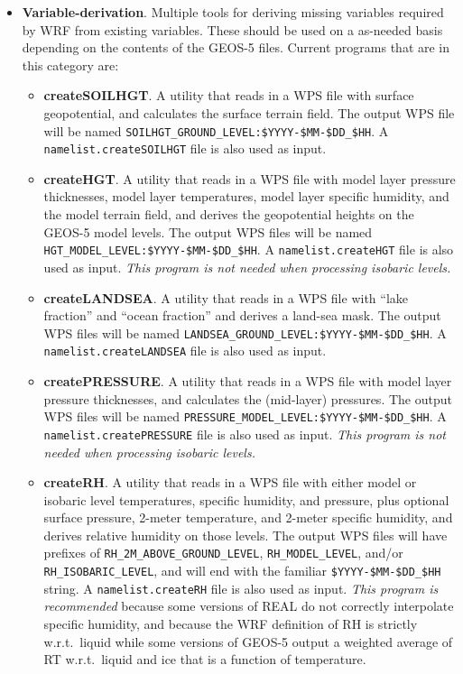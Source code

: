 \begin{itemize}
\item \textbf{Variable-derivation}. Multiple tools for deriving missing 
variables required by WRF from existing variables. These should be used on a
as-needed basis depending on the contents of the GEOS-5 files. Current 
programs that are in this category are: 
\begin{itemize}

\item \textbf{createSOILHGT}.  A utility that reads in a WPS file with surface 
  geopotential, and calculates the surface terrain field.  The output WPS file
  will be named \texttt{SOILHGT\_GROUND\_LEVEL:\$YYYY-\$MM-\$DD\_\$HH}.  A 
  \texttt{namelist.createSOILHGT} file is also used as input.

\item \textbf{createHGT}. A utility that reads in a WPS file with model layer 
  pressure thicknesses, model layer temperatures, model layer specific 
  humidity, and the model terrain field, and derives the geopotential heights 
  on the GEOS-5 model levels.  The output WPS files will be named 
  \texttt{HGT\_MODEL\_LEVEL:\$YYYY-\$MM-\$DD\_\$HH}.  A 
  \texttt{namelist.createHGT} file is also used as input.  
  \emph{This program is not needed when processing isobaric levels.}
  
\item \textbf{createLANDSEA}. A utility that reads in a WPS file with 
  ``lake fraction'' and ``ocean fraction'' and derives a land-sea mask.  The 
  output WPS files will be named 
  \texttt{LANDSEA\_GROUND\_LEVEL:\$YYYY-\$MM-\$DD\_\$HH}.  A 
  \texttt{namelist.createLANDSEA} file is also used as input.

\item \textbf{createPRESSURE}. A utility that reads in a WPS file with model 
  layer pressure thicknesses, and calculates the (mid-layer) pressures.  The 
  output WPS files will be named 
  \texttt{PRESSURE\_MODEL\_LEVEL:\$YYYY-\$MM-\$DD\_\$HH}.  A 
  \texttt{namelist.createPRESSURE} file is also used as input.  
  \emph{This program is not needed when processing isobaric levels.}

\item \textbf{createRH}. A utility that reads in a WPS file with either model 
  or isobaric level temperatures, specific humidity, and pressure, plus 
  optional surface pressure, 2-meter temperature, and 2-meter specific 
  humidity, and derives relative humidity on those levels.  The output WPS 
  files will have prefixes of
  \texttt{RH\_2M\_ABOVE\_GROUND\_LEVEL}, \texttt{RH\_MODEL\_LEVEL}, and/or 
  \texttt{RH\_ISOBARIC\_LEVEL}, and will end with the familiar 
  \texttt{\$YYYY-\$MM-\$DD\_\$HH} string.  A \texttt{namelist.createRH} file 
  is also used as input. \emph{This program is recommended} because some 
  versions of REAL do not correctly interpolate specific 
  humidity, and because the WRF definition of RH is strictly w.r.t.~liquid 
  while some versions of GEOS-5 output a weighted average of RT 
  w.r.t.~liquid and ice that is a function of temperature.
  

\end{itemize}
\end{itemize}
